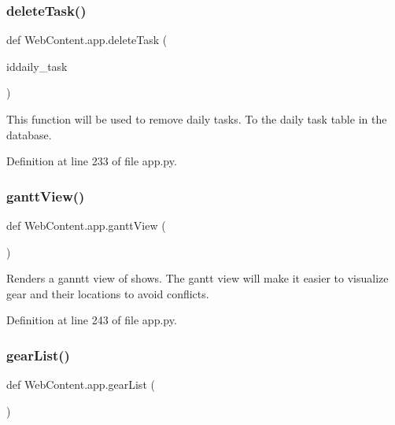\mbox{\label{namespace_web_content_1_1app_af2ca8754b886a2732a45b71b8a53f185}} 
\subsubsection{\texorpdfstring{delete\+Task()}{deleteTask()}}
{\footnotesize\ttfamily def Web\+Content.\+app.\+delete\+Task (\begin{DoxyParamCaption}\item[{}]{iddaily\+\_\+task }\end{DoxyParamCaption})}

\begin{DoxyVerb}This function will be used to remove daily tasks.
To the daily task table in the database. 
\end{DoxyVerb}
 

Definition at line 233 of file app.\+py.

\mbox{\label{namespace_web_content_1_1app_ad3f479298a258fcecb0cf0fae0c3e6de}} 
\subsubsection{\texorpdfstring{gantt\+View()}{ganttView()}}
{\footnotesize\ttfamily def Web\+Content.\+app.\+gantt\+View (\begin{DoxyParamCaption}{ }\end{DoxyParamCaption})}

\begin{DoxyVerb}Renders a ganntt view of shows.
The gantt view will make it easier to visualize
gear and their locations to avoid conflicts.
\end{DoxyVerb}
 

Definition at line 243 of file app.\+py.

\mbox{\label{namespace_web_content_1_1app_a6e8308958b72dbb2468ed92b6389d990}} 
\subsubsection{\texorpdfstring{gear\+List()}{gearList()}}
{\footnotesize\ttfamily def Web\+Content.\+app.\+gear\+List (\begin{DoxyParamCaption}{ }\end{DoxyParamCaption})}

